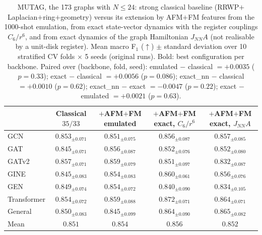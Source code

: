 \begin{table}[t]
\caption{%
  MUTAG, the 173 graphs with $N \le 24$: strong classical baseline (RRWP${+}$Laplacian${+}$ring${+}$geometry) versus its extension by AFM${+}$FM features from the 1000-shot
  emulation, from exact state-vector dynamics with the register couplings $C_6/r^6$, and
  from exact dynamics of the graph Hamiltonian $J_{NN} A$ (not realisable by a unit-disk
  register). Mean macro F$_1$ ($\uparrow$) $\pm$ standard deviation over 10 stratified
  CV folds $\times$ 5 seeds (original runs). Bold: best configuration per backbone.
  Paired over (backbone, fold, seed): emulated ${-}$ classical $= +0.0035$ ($p=0.33$); exact ${-}$ classical $= +0.0056$ ($p=0.086$); exact_nn ${-}$ classical $= +0.0010$ ($p=0.62$); exact_nn ${-}$ exact $= -0.0047$ ($p=0.22$); exact ${-}$ emulated $= +0.0021$ ($p=0.63$).
}
\label{tab:mutag-exact-non-unit-disk}
\centering
\small
\setlength{\tabcolsep}{4pt}
\begin{tabular}{l c c c c}
\toprule
 & \shortstack{Classical\\ \scriptsize $35/33$} & \shortstack{${+}$AFM${+}$FM\\ \scriptsize emulated} & \shortstack{${+}$AFM${+}$FM\\ \scriptsize exact, $C_6/r^6$} & \shortstack{${+}$AFM${+}$FM\\ \scriptsize exact, $J_{NN}A$} \\
\midrule
  GCN          & $0.853{_{\pm 0.071}}$ & $0.851{_{\pm 0.075}}$ & $0.856{_{\pm 0.087}}$ & $\mathbf{0.857}{_{\pm 0.085}}$ \\
  GAT          & $0.845{_{\pm 0.071}}$ & $\mathbf{0.856}{_{\pm 0.087}}$ & $0.852{_{\pm 0.076}}$ & $0.852{_{\pm 0.080}}$ \\
  GATv2        & $0.857{_{\pm 0.071}}$ & $\mathbf{0.859}{_{\pm 0.079}}$ & $0.851{_{\pm 0.097}}$ & $0.832{_{\pm 0.087}}$ \\
  GINE         & $0.845{_{\pm 0.083}}$ & $0.854{_{\pm 0.083}}$ & $\mathbf{0.860}{_{\pm 0.061}}$ & $0.856{_{\pm 0.076}}$ \\
  GEN          & $0.849{_{\pm 0.074}}$ & $\mathbf{0.854}{_{\pm 0.072}}$ & $0.840{_{\pm 0.090}}$ & $0.834{_{\pm 0.105}}$ \\
  Transformer  & $0.854{_{\pm 0.072}}$ & $0.859{_{\pm 0.088}}$ & $\mathbf{0.872}{_{\pm 0.071}}$ & $0.864{_{\pm 0.071}}$ \\
  General      & $0.850{_{\pm 0.083}}$ & $0.845{_{\pm 0.099}}$ & $0.864{_{\pm 0.090}}$ & $\mathbf{0.865}{_{\pm 0.082}}$ \\
\midrule
  Mean & $0.851$ & $0.854$ & $0.856$ & $0.852$ \\
\bottomrule
\end{tabular}
\end{table}
